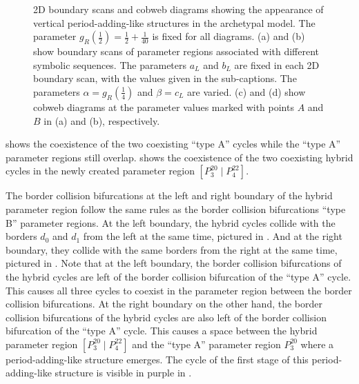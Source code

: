 \begin{figure}
{		\label{fig:add.change.appa.vert.cobweb.B}
	}
	\caption[2D boundary scans and cobweb diagrams showing the appearance of vertical period-adding-like structures in the archetypal model]{
		2D boundary scans and cobweb diagrams showing the appearance of vertical period-adding-like structures in the archetypal model.
		The parameter $g_R\left(\frac{1}{2}\right) = \frac{1}{2} + \frac{1}{40}$ is fixed for all diagrams.
		(a) and (b) show boundary scans of parameter regions associated with different symbolic sequences.
		The parameters $a_L$ and $b_L$ are fixed in each 2D boundary scan, with the values given in the sub-captions.
		The parameters $\alpha = g_R\left(\frac{1}{4}\right)$ and $\beta = c_L$ are varied.
		(c) and (d) show cobweb diagrams at the parameter values marked with points $A$ and $B$ in (a) and (b), respectively.
	}
\end{figure}

 shows the coexistence of the two coexisting ``type A'' cycles while the ``type A'' parameter regions still overlap.
 shows the coexistence of the two coexisting hybrid cycles in the newly created parameter region $\left[P^{20}_3 \mid P^{22}_4\right]$.

The border collision bifurcations at the left and right boundary of the hybrid parameter region follow the same rules as the border collision bifurcations ``type B'' parameter regions.
At the left boundary, the hybrid cycles collide with the borders $d_0$ and $d_1$ from the left at the same time, pictured in .
And at the right boundary, they collide with the same borders from the right at the same time, pictured in .
Note that at the left boundary, the border collision bifurcations of the hybrid cycles are left of the border collision bifurcation of the ``type A'' cycle.
This causes all three cycles to coexist in the parameter region between the border collision bifurcations.
At the right boundary on the other hand, the border collision bifurcations of the hybrid cycles are also left of the border collision bifurcation of the ``type A'' cycle.
This causes a space between the hybrid parameter region $\left[P^{20}_3 \mid P^{22}_4\right]$ and the ``type A'' parameter region $P^{20}_3$ where a period-adding-like structure emerges.
The cycle of the first stage of this period-adding-like structure is visible in purple in .

